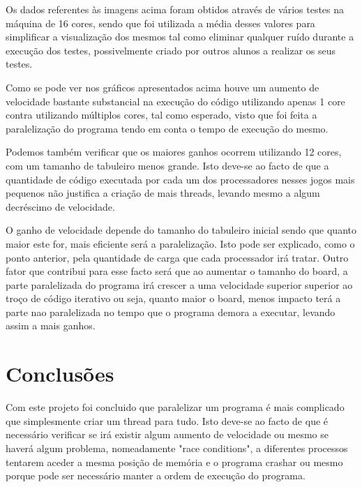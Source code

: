 \documentclass[a4paper]{article}
\begin{document}
Os dados referentes às imagens acima foram obtidos através de vários testes na máquina de 16 cores, sendo que foi utilizada a média desses valores para simplificar a visualização dos mesmos tal como eliminar qualquer ruído durante a execução dos testes, possivelmente criado por outros alunos a realizar os seus testes.

Como se pode ver nos gráficos apresentados acima houve um aumento de velocidade bastante substancial na execução do código utilizando apenas 1 core contra utilizando múltiplos cores, tal como esperado, visto que foi feita a paralelização do programa tendo em conta o tempo de execução do mesmo.


Podemos também verificar que os maiores ganhos ocorrem utilizando 12 cores, com um tamanho de tabuleiro menos grande. Isto deve-se ao facto de que a quantidade de código executada por cada um dos processadores nesses jogos mais pequenos não justifica a criação de mais threads, levando mesmo a algum decréscimo de velocidade. 

O ganho de velocidade depende do tamanho do tabuleiro inicial sendo que quanto maior este for, mais eficiente será a paralelização. Isto pode ser explicado, como o ponto anterior, pela quantidade de carga que cada processador irá tratar. Outro fator que contribui para esse facto será que ao aumentar o tamanho do board, a parte paralelizada do programa irá crescer a uma velocidade superior superior ao troço de código iterativo ou seja, quanto maior o board, menos impacto terá a parte nao paralelizada no tempo que o programa demora a executar, levando assim a mais ganhos.

\section{Conclusões}
Com este projeto foi concluido que paralelizar um programa é mais complicado que simplesmente criar um thread para tudo. Isto deve-se ao facto de que é necessário verificar se irá existir algum aumento de velocidade ou mesmo se haverá algum problema, nomeadamente "race conditions", a diferentes processos tentarem aceder a mesma posição de memória e o programa crashar ou mesmo porque pode ser necessário manter a ordem de execução do programa. 
\end{document}
